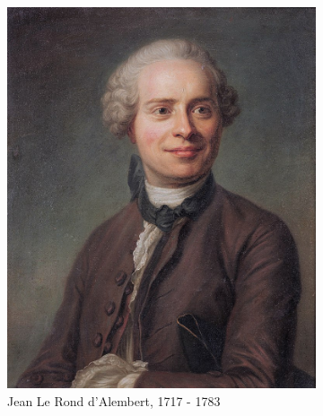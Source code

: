 \documentclass[5pt,a4paper]{article}
\begin{document}
\begin{onehalfspacing}
\begin{figure}[h]
    \centering
    \begin{subfigure}{0.4\textwidth}
    \centering
        \includegraphics[height=0.152\textheight]{ressources/dalembert.jpg}
        \caption{Jean Le Rond d'Alembert, 1717 - 1783}
    \end{subfigure}
    \hfill
    \begin{subfigure}{0.4\textwidth}
    \centering

\end{subfigure}
\end{figure}
\end{onehalfspacing}
\end{document}
